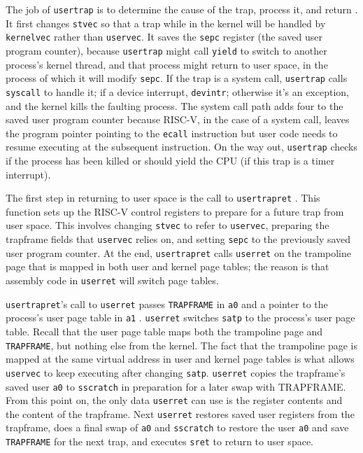 The job of {\tt usertrap} is to determine
the cause of the trap, process it, and return
.
It first changes {\tt stvec} so
that a trap while in the kernel will be handled by
{\tt kernelvec} rather than {\tt uservec}.
It saves the {\tt sepc} register (the saved user program counter),
because 
{\tt usertrap} might call \lstinline{yield} to switch
to another process's kernel thread, and that process might return
to user space, in the process of which it will modify \lstinline{sepc}.
If the trap is a system call, {\tt usertrap} calls {\tt syscall} to
handle it;
if a device interrupt, {\tt devintr};
otherwise it's an exception, and the kernel kills the
faulting process.
The system call path adds four to the saved user program counter
because RISC-V, in the case of a system call,
leaves the program pointer pointing to the {\tt ecall} instruction
but user code needs to resume executing at the subsequent instruction.
On the way out, {\tt usertrap} checks if the process has been
killed or should yield the CPU (if this trap is a timer interrupt).

The first step in returning to user space is the call to {\tt usertrapret}
.
This function sets up the RISC-V control registers to prepare for a
future trap from user space. This involves changing {\tt stvec}
to refer to {\tt uservec}, preparing the trapframe fields that
{\tt uservec} relies on, and setting {\tt sepc} to the previously
saved user program counter. At the end, {\tt usertrapret}
calls {\tt userret} on the trampoline page that is mapped in
both user and kernel page tables; the reason is that assembly
code in {\tt userret} will switch page tables.

{\tt usertrapret}'s call to {\tt userret} passes {\tt TRAPFRAME} in 
{\tt a0} and a pointer to the process's user page table in {\tt a1}
.
{\tt userret} switches {\tt satp} to the process's user page table.
Recall that the user page table maps both the trampoline page
and {\tt TRAPFRAME}, but nothing else from the kernel.
The fact that the trampoline page is mapped at the same
virtual address in user and kernel page tables is what allows
{\tt uservec} to keep executing after changing {\tt satp}.
{\tt userret} copies the trapframe's saved user {\tt a0} to {\tt sscratch}
in preparation for a later swap with TRAPFRAME.
From this point on, the only data {\tt userret} can use is
the register contents and the content of the trapframe.
Next {\tt userret} restores saved user registers from the trapframe,
does a final swap of {\tt a0} and {\tt sscratch} to restore the
user {\tt a0} and save {\tt TRAPFRAME} for the next trap,
and executes {\tt sret} to return to user space.

